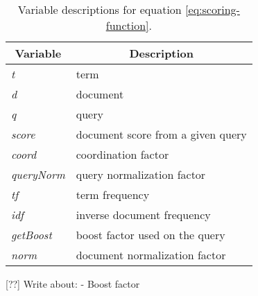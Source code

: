 \begin{table}
		\centering
    \begin{tabular}{|l|l|}
    \hline
		\multicolumn{1}{|c|}{\bfseries Variable} & \multicolumn{1}{c|}{\bfseries Description} \\ \hline
    \textit{t}         & term                           		\\ \hline
    \textit{d}         & document                       		\\ \hline
    \textit{q}         & query                          		\\ \hline
		\textit{score}     & document score from a given query	\\ \hline
    \textit{coord}     & coordination factor            		\\ \hline
    \textit{queryNorm} & query normalization factor     		\\ \hline
    \textit{tf}        & term frequency                 		\\ \hline
    \textit{idf}       & inverse document frequency     		\\ \hline
    \textit{getBoost}  & boost factor used on the query 		\\ \hline
    \textit{norm}      & document normalization factor  		\\ \hline
    \end{tabular}
		\caption{Variable descriptions for equation \ref{eq:scoring-function}.}
		\label{tbl:scoring-function}
\end{table}

[??] Write about:
- Boost factor

